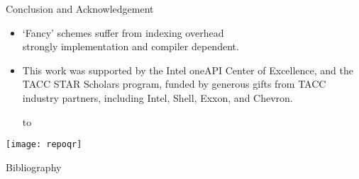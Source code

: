 \documentclass[10pt]{beamer}
\begin{document}
\begin{comment}
  \begin{numberedframe}{Can we use execution policies?}
    \begin{itemize}
    \item Last time I tried there was a compiler issue
    \item That 5-point stencil is hard to express in range views!
    \end{itemize}
  \end{numberedframe}
\end{comment}

\begin{numberedframe}{Conclusion and Acknowledgement}
  \begin{itemize}
  \item `Fancy' schemes suffer from indexing overhead\\
    strongly implementation and compiler dependent.
  \item This work was supported by
    the Intel oneAPI Center of Excellence, and the 
    TACC STAR Scholars program,
    funded by generous gifts from TACC industry partners, including Intel, Shell, Exxon,
    and Chevron.\par
  \hbox to 
  \end{itemize}
  \texttt{[image: repoqr]}
\end{numberedframe}

\begin{numberedframe}{Bibliography}
  
  
\end{numberedframe}
\end{document}
